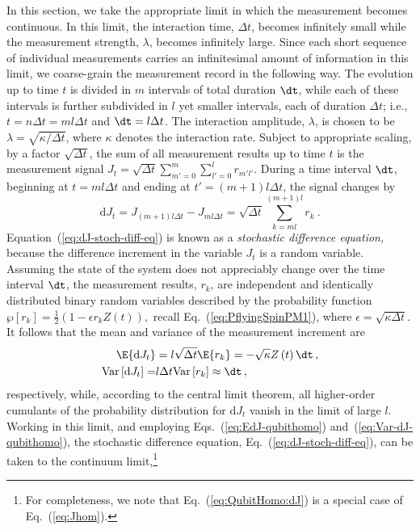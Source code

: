 In this section, we take the appropriate limit in which the measurement
becomes continuous. In this limit, the interaction time, $\Delta t$,
becomes infinitely small while the measurement strength, $\lambda$,
becomes infinitely large. Since each short sequence of individual
measurements carries an infinitesimal amount of information in this
limit, we coarse-grain the measurement record in the following way.
The evolution up to time $t$ is divided in $m$ intervals of total
duration $\dt$, while each of these intervals is further subdivided
in $l$ yet smaller intervals, each of duration $\Delta t$; i.e.,
$t=n\Delta t=ml\Delta t$ and $\dt=l\Delta t$. The interaction amplitude,
$\lambda$, is chosen to be $\lambda=\sqrt{\kappa/\Delta t}$, where
$\kappa$ denotes the interaction rate. Subject to appropriate scaling,
by a factor $\sqrt{\Delta t}$, the sum of all measurement results
up to time $t$ is the measurement signal $J_{t}=\sqrt{\Delta t}\sum_{m'=0}^{m}\sum_{l'=0}^{l}r_{m'l'}$.
During a time interval $\dt$, beginning at $t=ml\Delta t$ and ending
at $t'=\left(m+1\right)l\Delta t$, the signal changes by 
\begin{equation}
\mathrm{d}J_{t}=J_{\left(m+1\right)l\Delta t}-J_{ml\Delta t}=\sqrt{\Delta t}\sum_{k=ml}^{\left(m+1\right)l}r_{k}\:.\label{eq:dJ-stoch-diff-eq}
\end{equation}
Equation~(\ref{eq:dJ-stoch-diff-eq}) is known as a \emph{stochastic
difference equation, }because the difference increment in the variable
$J_{t}$ is a random variable. Assuming the state of the system does
not appreciably change over the time interval $\dt$, the measurement
results, $r_{k}$, are independent and identically distributed binary
random variables described by the probability function $\wp\left[r_{k}\right]=\frac{1}{2}\left(1-\epsilon r_{k}Z\left(t\right)\right),$
recall Eq.~(\ref{eq:PflyingSpinPM1}), where $\epsilon=\sqrt{\kappa\Delta t}$.
It follows that the mean and variance of the measurement increment
are 
\begin{align}
\E{\mathrm{d}J_{t}} & =l\sqrt{\Delta t}\E{r_{k}}=-\sqrt{\kappa}Z\left(t\right)\dt\,,\label{eq:EdJ-qubithomo}\\
\mathrm{Var}\left[\mathrm{d}J_{t}\right]= & l\Delta t\mathrm{Var}\left[r_{k}\right]\approx\dt\,,\label{eq:Var-dJ-qubithomo}
\end{align}
respectively, while, according to the central limit theorem, all higher-order
cumulants of the probability distribution for $\mathrm{d}J_{t}$ vanish
in the limit of large $l$. Working in this limit, and employing Eqs.~(\ref{eq:EdJ-qubithomo})
and~(\ref{eq:Var-dJ-qubithomo}), the stochastic difference equation,
Eq.~(\ref{eq:dJ-stoch-diff-eq}), can be taken to  the continuum
limit,\footnote{For completeness, we note that Eq.~(\ref{eq:QubitHomo:dJ}) is a
special case of Eq.~(\ref{eq:Jhom}). }

